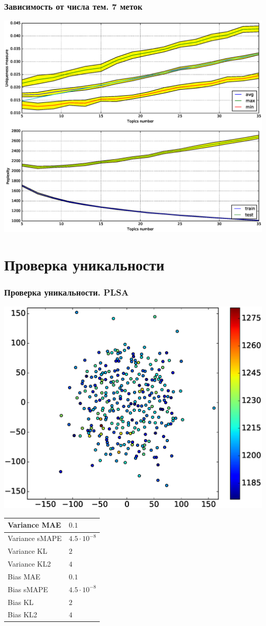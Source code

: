 \documentclass[utf8]{beamer}
\begin{document}
	
	\begin{frame}	
	\frametitle{Зависимость от числа тем. 7 меток}
	\includegraphics[width=0.75\linewidth]{presentation_pictures/topics_dependency_origin_big_ums.eps} 
	\end{frame}
	
	\section{Проверка уникальности}
	\begin{frame}	
	\frametitle{Проверка уникальности. PLSA}
	 \includegraphics[width=0.5\linewidth]{presentation_pictures/plsa.eps} 
    \begin{tabular}[b]{| l | l | }\hline
      Variance MAE & $0.1$ \\ \hline
      Variance sMAPE  & $4.5 \cdot 10^{-8}$ \\ \hline
      Variance KL  & $2$ \\ \hline
      Variance KL2  & $4$ \\ \hline

      Bias MAE & $0.1$ \\ \hline
      Bias sMAPE  & $4.5 \cdot 10^{-8}$ \\ \hline
      Bias KL  & $2$ \\ \hline
      Bias KL2  & $4$ \\ \hline
    \end{tabular}

	\end{frame}
	
\end{document}
